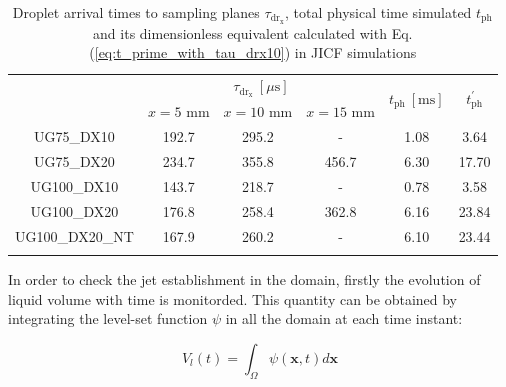 \begin{table}[!h]
\centering
\caption{Droplet arrival times to sampling planes $\tau_\mathrm{dr_x}$, total physical time simulated $t_\mathrm{ph}$ and its dimensionless equivalent calculated with Eq. (\ref{eq:t_prime_with_tau_drx10}) in JICF simulations}
\begin{tabular}{cccccc}
\thickhline
\multirow{2}{*}{ \textbf{Case}} &  \multicolumn{3}{c}{$\tau_\mathrm{dr_x} ~ [\mu \mathrm{s}]$} & \multirow{2}{*}{ $t_\mathrm{ph}~[\mathrm{ms}]$} & \multirow{2}{*}{ $t_\mathrm{ph}^{\prime}$} \\
\cline{2-4}
 & $x = 5$ mm & $x = 10$ mm & $x = 15$ mm  \\
\thickhline 
UG75\_DX10  & 192.7 & 295.2 & - & 1.08 & 3.64  \\
UG75\_DX20  & 234.7 & 355.8 & 456.7 & 6.30 & 17.70  \\
UG100\_DX10 & 143.7 & 218.7 & - & 0.78 & 3.58 \\
UG100\_DX20 & 176.8 & 258.4 & 362.8 & 6.16 & 23.84 \\
UG100\_DX20\_NT & 167.9 & 260.2 & - & 6.10 & 23.44 \\
\thickhline
\end{tabular}
\label{tab:jicf_characteristic_droplet_sampling_times}
\end{table}

In order to check the jet establishment in the domain, firstly the evolution of liquid volume with time is monitorded. This quantity can be obtained by integrating the level-set function $\psi$ in all the domain at each time instant:

\begin{equation}
\label{eq:liquid_volume_from_levelset_definition}
V_l \left ( t \right) = \int_{\Omega} \psi \left( \textbf{x}, t \right) d\textbf{x}
\end{equation}


